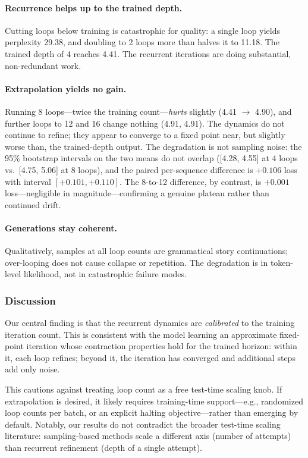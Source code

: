 \paragraph{Recurrence helps up to the trained depth.} Cutting loops
below training is catastrophic for quality: a single loop yields
perplexity 29.38, and doubling to 2 loops more than halves it to 11.18.
The trained depth of 4 reaches 4.41. The recurrent iterations are doing
substantial, non-redundant work.

\paragraph{Extrapolation yields no gain.} Running 8 loops---twice the
training count---\emph{hurts} slightly (4.41 $\rightarrow$ 4.90), and
further loops to 12 and 16 change nothing (4.91, 4.91). The dynamics do
not continue to refine; they appear to converge to a fixed point near,
but slightly worse than, the trained-depth output. The degradation is
not sampling noise: the 95\% bootstrap intervals on the two means do not
overlap ([4.28, 4.55] at 4 loops vs.\ [4.75, 5.06] at 8 loops), and the
paired per-sequence difference is $+0.106$ loss with interval
$[+0.101, +0.110]$. The 8-to-12 difference, by contrast, is $+0.001$
loss---negligible in magnitude---confirming a genuine
plateau rather than continued drift.

\paragraph{Generations stay coherent.} Qualitatively, samples at all
loop counts are grammatical story continuations; over-looping does not
cause collapse or repetition. The degradation is in token-level
likelihood, not in catastrophic failure modes.

\subsubsection{Discussion}

Our central finding is that the recurrent dynamics are \emph{calibrated}
to the training iteration count. This is consistent with the model
learning an approximate fixed-point iteration whose contraction
properties hold for the trained horizon: within it, each loop refines;
beyond it, the iteration has converged and additional steps add only
noise.

This cautions against treating loop count as a free test-time scaling
knob. If extrapolation is desired, it likely requires training-time
support---e.g., randomized loop counts per batch, or an explicit
halting objective---rather than emerging by default. Notably, our
results do not contradict the broader test-time scaling literature:
sampling-based methods \citep{snell2024scaling} scale a different axis
(number of attempts) than recurrent refinement (depth of a single
attempt).

